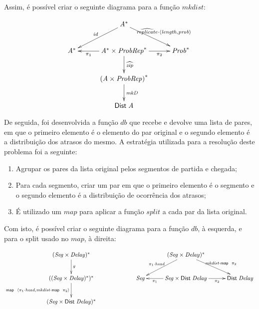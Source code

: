 \documentclass[11pt, a4paper, fleqn]{article}
\newcommand{\Conid}[1]{\mathit{#1}}
\newcommand{\Varid}[1]{\mathit{#1}}
\begin{document}
Assim, é possível criar o seguinte diagrama para a função $mkdist$:

\begin{eqnarray*}
\xymatrix@C=1cm{
&
        \ensuremath{\Conid{A}}^*
            \ar[dl]_-{\ensuremath{\Varid{id}}}
            \ar[dr]^-{\ensuremath{\uncurry{\Varid{replicate}}\comp \conj{\length }{\Varid{prob}}}}
&
\\
        \ensuremath{\Conid{A}}^*
&
        \ensuremath{\Conid{A}}^* \ensuremath{\times} \ensuremath{\Conid{ProbRep}}^*
            \ar[l]^-{\ensuremath{\p1}}
            \ar[r]_-{\ensuremath{\p2}}
            \ar[d]^-{\ensuremath{\uncurry{\Varid{zip}}}}
&
        \ensuremath{\Conid{Prob}}^*
\\
&
        {(\ensuremath{\Conid{A}} \ensuremath{\times} \ensuremath{\Conid{ProbRep}})}^*
            \ar[d]^-{\ensuremath{\Varid{mkD}}}
&
\\
&
        \ensuremath{\fun{Dist}\;\Conid{A}}
    }
\end{eqnarray*}

De seguida, foi desenvolvida a função $db$ que recebe e devolve uma lista de pares, em que o primeiro elemento é o elemento do par original e o segundo elemento é a distribuição dos atrasos do mesmo.
A estratégia utilizada para a resolução deste problema foi a seguinte:
\begin{enumerate}
    \item Agrupar os pares da lista original pelos segmentos de partida e chegada;
    \item Para cada segmento, criar um par em que o primeiro elemento é o segmento e o segundo elemento é a distribuição de ocorrência dos atrasos;
    \item É utilizado um $map$ para aplicar a função $split$ a cada par da lista original.
\end{enumerate}

Com isto, é possível criar o seguinte diagrama para a função $db$, à esquerda, e para o split usado no $map$, à direita:

\begin{eqnarray*}
\xymatrix@C=1cm{
        \ensuremath{(\Conid{Seg}\times\Conid{Delay})}^*
            \ar[d]^-{g}
&
&
&
        \ensuremath{(\Conid{Seg}\times\Conid{Delay})}^* 
            \ar[ld]_-{\ensuremath{\p1\comp \Varid{head}}}
            \ar[rd]^-{\ensuremath{\Varid{mkdist}\comp \map \;\p2}}
&  
\\
        \ensuremath{((\Conid{Seg}\times\Conid{Delay})}^*\ensuremath{)}^* 
            \ar[d]_-{\ensuremath{\map \;\conj{\p1\comp \Varid{head}}{\Varid{mkdist}\comp \map \;\p2}}} 
&
&
        \ensuremath{\Conid{Seg}}
&
        \ensuremath{\Conid{Seg}\times\fun{Dist}\;\Conid{Delay}}
            \ar[l]^-{\ensuremath{\p1}}
            \ar[r]_-{\ensuremath{\p2}}
&
        \ensuremath{\fun{Dist}\;\Conid{Delay}}
\\
        \ensuremath{(\Conid{Seg}\times\fun{Dist}\;\Conid{Delay})}^*
&
&
&
& 
}
\end{eqnarray*}
\end{document}
